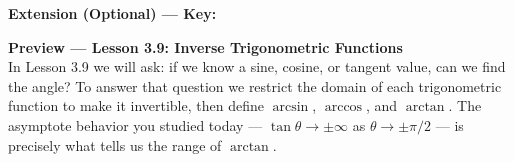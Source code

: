 \documentclass[10pt]{article}
\begin{document}
\vspace{0.06in}

\begin{extensionbox}
\textbf{Extension (Optional) --- Key:}

\end{extensionbox}

\vspace{0.06in}

\begin{tcolorbox}[colback=navylight, colframe=navy, arc=2mm,
    left=3mm, right=3mm, top=2mm, bottom=2mm]
\small\textbf{Preview --- Lesson 3.9: Inverse Trigonometric Functions}\\
In Lesson 3.9 we will ask: if we know a sine, cosine, or tangent value, can we
find the angle?  To answer that question we restrict the domain of each
trigonometric function to make it invertible, then define $\arcsin$, $\arccos$,
and $\arctan$.  The asymptote behavior you studied today --- $\tan\theta\to\pm\infty$
as $\theta\to\pm\pi/2$ --- is precisely what tells us the range of $\arctan$.
\end{tcolorbox}
\end{document}
